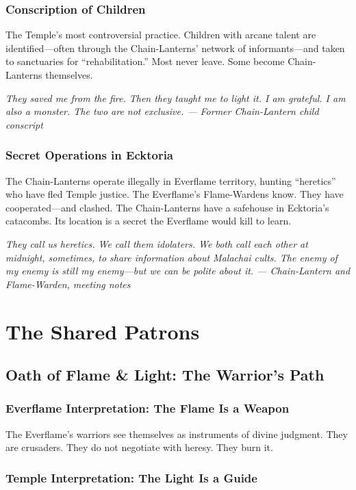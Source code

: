 \documentclass{book}
\newcommand{\citation}[1]{\textcolor{marginalia}{\small\textit{#1}}}
\begin{document}
\section{Conscription of Children}

The Temple's most controversial practice. Children with arcane talent are identified---often through the Chain-Lanterns' network of informants---and taken to sanctuaries for ``rehabilitation.'' Most never leave. Some become Chain-Lanterns themselves.

\citation{They saved me from the fire. Then they taught me to light it. I am grateful. I am also a monster. The two are not exclusive. --- Former Chain-Lantern child conscript}

\section{Secret Operations in Ecktoria}

The Chain-Lanterns operate illegally in Everflame territory, hunting ``heretics'' who have fled Temple justice. The Everflame's Flame-Wardens know. They have cooperated---and clashed. The Chain-Lanterns have a safehouse in Ecktoria's catacombs. Its location is a secret the Everflame would kill to learn.

\citation{They call us heretics. We call them idolaters. We both call each other at midnight, sometimes, to share information about Malachai cults. The enemy of my enemy is still my enemy---but we can be polite about it. --- Chain-Lantern and Flame-Warden, meeting notes}

\part{The Shared Patrons}

\chapter{Oath of Flame \& Light: The Warrior's Path}

\section{Everflame Interpretation: The Flame Is a Weapon}

The Everflame's warriors see themselves as instruments of divine judgment. They are crusaders. They do not negotiate with heresy. They burn it.

\section{Temple Interpretation: The Light Is a Guide}
\end{document}
